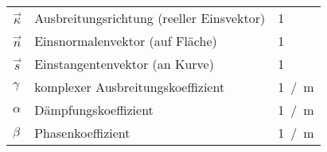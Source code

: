 \begin{tabular}{L{2cm}lL{4cm}}
	$\vec{\kappa}$  &Ausbreitungsrichtung (reeller Einsvektor)      &\si{1} \\
	$\vec{n}$       &Einsnormalenvektor (auf Fläche)   &\si{1} \\
	$\vec{s}$       &Einstangentenvektor (an Kurve)    &\si{1} \\
	$\gamma$        &komplexer Ausbreitungskoeffizient &\si{1 / \m}  \\
	$\alpha$        &Dämpfungskoeffizient              &\si{1 / \m}  \\
	$\beta$         &Phasenkoeffizient                 &\si{1 / \m}  \\ 
\end{tabular}\\